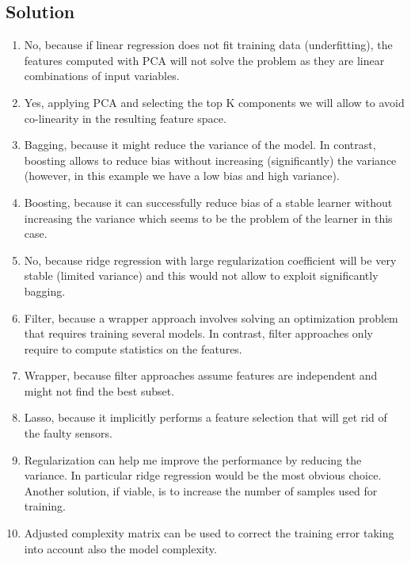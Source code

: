 \subsection*{Solution}
\begin{enumerate}
    \item No, because if linear regression does not fit training data (underfitting), the features computed with PCA will not solve the problem as they are linear combinations of input variables.
    \item Yes, applying PCA and selecting the top K components we will allow to avoid co-linearity in the resulting feature space.
    \item Bagging, because it might reduce the variance of the model. 
        In contrast, boosting allows to reduce bias without increasing (significantly) the variance (however, in this example we have a low bias and high variance).
    \item Boosting, because it can successfully reduce bias of a stable learner without increasing the variance which seems to be the problem of the learner in this case.
    \item No, because ridge regression with large regularization coefficient will be very stable (limited variance) and this would not allow to exploit significantly bagging.
    \item Filter, because a wrapper approach involves solving an optimization problem that requires training several models. 
        In contrast, filter approaches only require to compute statistics on the features.
    \item Wrapper, because filter approaches assume features are independent and might not find the best subset.
    \item Lasso, because it implicitly performs a feature selection that will get rid of the faulty sensors.
    \item Regularization can help me improve the performance by reducing the variance. 
        In particular ridge regression would be the most obvious choice. 
        Another solution, if viable, is to increase the number of samples used for training.
    \item Adjusted complexity matrix can be used to correct the training error taking into account also the model complexity.
\end{enumerate}